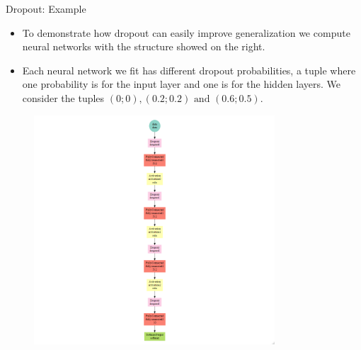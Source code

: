 \begin{vbframe}{Dropout: Example}
\begin{minipage}{0.5\textwidth}
  \begin{itemize}
    \item To demonstrate how dropout can easily improve generalization we compute neural networks with the structure showed on the right.
    \item Each neural network we fit has different dropout probabilities, a tuple where one probability is for the input layer and one is for the hidden layers. We consider the tuples $(0;0) , (0.2;0.2) \text{ and } (0.6;0.5)$.
  \end{itemize}
  \end{minipage}
  \begin{minipage}{0.45\textwidth}
  \begin{figure}
    \centering
    \vspace{-0.5cm}
      \includegraphics[width=9cm]{figure/mxnet_graph_dropout.png}
  \end{figure}
  \end{minipage}
\framebreak
%
%
%
%
%

\begin{knitrout}\scriptsize
{}\color{fgcolor}


\end{knitrout}
\end{vbframe}
